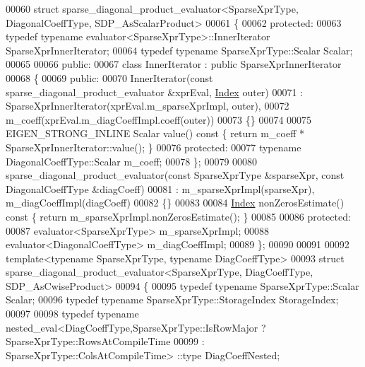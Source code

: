 \begin{DoxyCode}
00060 \textcolor{keyword}{struct }sparse\_diagonal\_product\_evaluator<SparseXprType, DiagonalCoeffType, SDP\_AsScalarProduct>
00061 \{
00062 \textcolor{keyword}{protected}:
00063   \textcolor{keyword}{typedef} \textcolor{keyword}{typename} evaluator<SparseXprType>::InnerIterator SparseXprInnerIterator;
00064   \textcolor{keyword}{typedef} \textcolor{keyword}{typename} SparseXprType::Scalar Scalar;
00065   
00066 \textcolor{keyword}{public}:
00067   \textcolor{keyword}{class }InnerIterator : \textcolor{keyword}{public} SparseXprInnerIterator
00068   \{
00069   \textcolor{keyword}{public}:
00070     InnerIterator(\textcolor{keyword}{const} sparse\_diagonal\_product\_evaluator &xprEval, \hyperlink{namespace_eigen_a62e77e0933482dafde8fe197d9a2cfde}{Index} outer)
00071       : SparseXprInnerIterator(xprEval.m\_sparseXprImpl, outer),
00072         m\_coeff(xprEval.m\_diagCoeffImpl.coeff(outer))
00073     \{\}
00074     
00075     EIGEN\_STRONG\_INLINE Scalar value()\textcolor{keyword}{ const }\{ \textcolor{keywordflow}{return} m\_coeff * SparseXprInnerIterator::value(); \}
00076   \textcolor{keyword}{protected}:
00077     \textcolor{keyword}{typename} DiagonalCoeffType::Scalar m\_coeff;
00078   \};
00079   
00080   sparse\_diagonal\_product\_evaluator(\textcolor{keyword}{const} SparseXprType &sparseXpr, \textcolor{keyword}{const} DiagonalCoeffType &diagCoeff)
00081     : m\_sparseXprImpl(sparseXpr), m\_diagCoeffImpl(diagCoeff)
00082   \{\}
00083 
00084   \hyperlink{namespace_eigen_a62e77e0933482dafde8fe197d9a2cfde}{Index} nonZerosEstimate()\textcolor{keyword}{ const }\{ \textcolor{keywordflow}{return} m\_sparseXprImpl.nonZerosEstimate(); \}
00085     
00086 \textcolor{keyword}{protected}:
00087   evaluator<SparseXprType> m\_sparseXprImpl;
00088   evaluator<DiagonalCoeffType> m\_diagCoeffImpl;
00089 \};
00090 
00091 
00092 \textcolor{keyword}{template}<\textcolor{keyword}{typename} SparseXprType, \textcolor{keyword}{typename} DiagCoeffType>
00093 \textcolor{keyword}{struct }sparse\_diagonal\_product\_evaluator<SparseXprType, DiagCoeffType, SDP\_AsCwiseProduct>
00094 \{
00095   \textcolor{keyword}{typedef} \textcolor{keyword}{typename} SparseXprType::Scalar Scalar;
00096   \textcolor{keyword}{typedef} \textcolor{keyword}{typename} SparseXprType::StorageIndex StorageIndex;
00097   
00098   \textcolor{keyword}{typedef} \textcolor{keyword}{typename} nested\_eval<DiagCoeffType,SparseXprType::IsRowMajor ? SparseXprType::RowsAtCompileTime
00099                                                                        : SparseXprType::ColsAtCompileTime>
      ::type DiagCoeffNested;

\end{DoxyCode}
